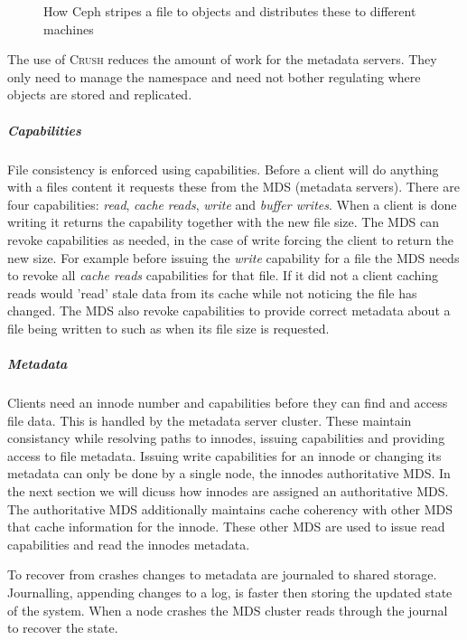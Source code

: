 \begin{figure}[htbp]
	\centering
	
	\caption{How Ceph stripes a file to objects and distributes these to different machines}
	\label{fig:ceph_crush}
\end{figure}

The use of \textsc{Crush} reduces the amount of work for the metadata servers. They only need to manage the namespace and need not bother regulating where objects are stored and replicated.

\subparagraph{Capabilities}
File consistency is enforced using capabilities. Before a client will do anything with a files content it requests these from the MDS (metadata servers). There are four capabilities: \textit{read}, \textit{cache} \textit{reads}, \textit{write} and \textit{buffer writes}. When a client is done writing it returns the capability together with the new file size. The MDS can revoke capabilities as needed, in the case of write forcing the client to return the new size. For example before issuing the \textit{write} capability for a file the MDS needs to revoke all \textit{cache reads} capabilities for that file. If it did not a client caching reads would 'read' stale data from its cache while not noticing the file has changed. The MDS also revoke capabilities to provide correct metadata about a file being written to such as when its file size is requested.

\subparagraph{Metadata}
Clients need an innode number and capabilities before they can find and access file data. This is handled by the metadata server cluster. These maintain consistancy while resolving paths to innodes, issuing capabilities and providing access to file metadata. Issuing write capabilities for an innode or changing its metadata can only be done  by a single node, the innodes authoritative MDS. In the next section we will dicuss how innodes are assigned an authoritative MDS. The authoritative MDS additionally maintains cache coherency with other MDS that cache information for the innode. These other MDS are used to issue read capabilities and read the innodes metadata.

To recover from crashes changes to metadata are journaled to shared storage. Journalling, appending changes to a log, is faster then storing the updated state of the system. When a node crashes the MDS cluster reads through the journal to recover the state.


